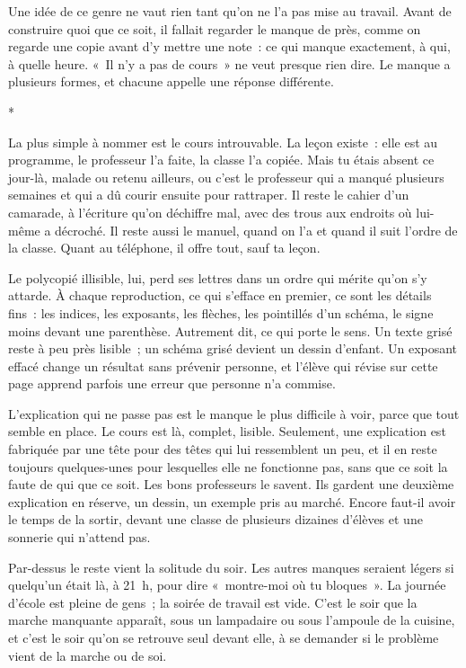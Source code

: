 \documentclass[10.5pt,twoside,openright]{book}
\newcommand{\asterisme}{\par\vspace{0.7em}\centerline{\color{gris}*\quad*\quad*}\vspace{0.7em}\par\noindent}
\begin{document}
Une idée de ce genre ne vaut rien tant qu’on ne l’a pas mise au travail. Avant de construire quoi que ce soit, il fallait regarder le manque de près, comme on regarde une copie avant d’y mettre une note : ce qui manque exactement, à qui, à quelle heure. « Il n’y a pas de cours » ne veut presque rien dire. Le manque a plusieurs formes, et chacune appelle une réponse différente.

\asterisme

La plus simple à nommer est le cours introuvable. La leçon existe : elle est au programme, le professeur l’a faite, la classe l’a copiée. Mais tu étais absent ce jour-là, malade ou retenu ailleurs, ou c’est le professeur qui a manqué plusieurs semaines et qui a dû courir ensuite pour rattraper. Il reste le cahier d’un camarade, à l’écriture qu’on déchiffre mal, avec des trous aux endroits où lui-même a décroché. Il reste aussi le manuel, quand on l’a et quand il suit l’ordre de la classe. Quant au téléphone, il offre tout, sauf ta leçon.

Le polycopié illisible, lui, perd ses lettres dans un ordre qui mérite qu’on s’y attarde. À chaque reproduction, ce qui s’efface en premier, ce sont les détails fins : les indices, les exposants, les flèches, les pointillés d’un schéma, le signe moins devant une parenthèse. Autrement dit, ce qui porte le sens. Un texte grisé reste à peu près lisible ; un schéma grisé devient un dessin d’enfant. Un exposant effacé change un résultat sans prévenir personne, et l’élève qui révise sur cette page apprend parfois une erreur que personne n’a commise.

L’explication qui ne passe pas est le manque le plus difficile à voir, parce que tout semble en place. Le cours est là, complet, lisible. Seulement, une explication est fabriquée par une tête pour des têtes qui lui ressemblent un peu, et il en reste toujours quelques-unes pour lesquelles elle ne fonctionne pas, sans que ce soit la faute de qui que ce soit. Les bons professeurs le savent. Ils gardent une deuxième explication en réserve, un dessin, un exemple pris au marché. Encore faut-il avoir le temps de la sortir, devant une classe de plusieurs dizaines d’élèves et une sonnerie qui n’attend pas.

Par-dessus le reste vient la solitude du soir. Les autres manques seraient légers si quelqu’un était là, à 21 h, pour dire « montre-moi où tu bloques ». La journée d’école est pleine de gens ; la soirée de travail est vide. C’est le soir que la marche manquante apparaît, sous un lampadaire ou sous l’ampoule de la cuisine, et c’est le soir qu’on se retrouve seul devant elle, à se demander si le problème vient de la marche ou de soi.
\end{document}
